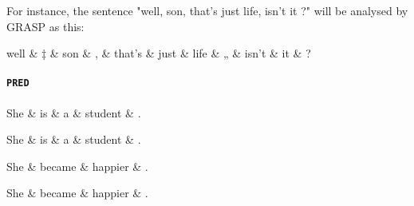 For instance, the sentence "well, son, that's just life, isn't it ?" will be analysed by GRASP as this:

\begin{dependency}
	\begin{deptext}
	well \& ‡ \& son \& , \& that's \& just \& life \& „ \& isn't \& it \& ?\\
	\end{deptext}
\end{dependency}



\clearpage
\paragraph{\texttt{PRED}}
\begin{minipage}[b]{0.5\linewidth}
\begin{dependency}
	\begin{deptext}
	She \& is \& a \& student \& .\\
	\end{deptext}
\end{dependency}
\end{minipage}
\begin{minipage}[b]{0.5\linewidth}
\begin{dependency}
	\begin{deptext}
	She \& is \& a \& student \& .\\
	\end{deptext}
\end{dependency}
\end{minipage}

\begin{minipage}[b]{0.5\linewidth}
\begin{dependency}
	\begin{deptext}
	She \& became \& happier \& .\\
	\end{deptext}
\end{dependency}
\end{minipage}
\begin{minipage}[b]{0.5\linewidth}
\begin{dependency}
	\begin{deptext}
	She \& became \& happier \& .\\
	\end{deptext}
\end{dependency}
\end{minipage}
